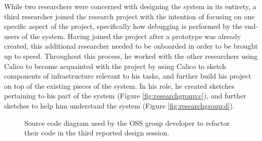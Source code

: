 %
%
%

While two researchers were concerned with designing the system in its entirety, a third researcher joined the research project with the intention of focusing on one specific aspect of the project, specifically how debugging is performed by the end-users of the system. Having joined the project after a prototype was already created, this additional researcher needed to be onboarded in order to be brought up to speed. Throughout this process, he worked with the other researchers using Calico to become acquainted with the project by using Calico to sketch components of infrastructure relevant to his tasks, and further build his project on top of the existing pieces of the system. In his role, he created sketches pertaining to his part of the system (Figure \ref{fig:researchgroup:c}), and further sketches to help him understand the system (Figure \ref{fig:researchgroup:d}).


\begin{figure}%
  \centering
   \caption {Source code diagram used by the OSS group developer to refactor their code in the third reported design session.}
   \label{fig:researchgroup:1}   
\end{figure}%

